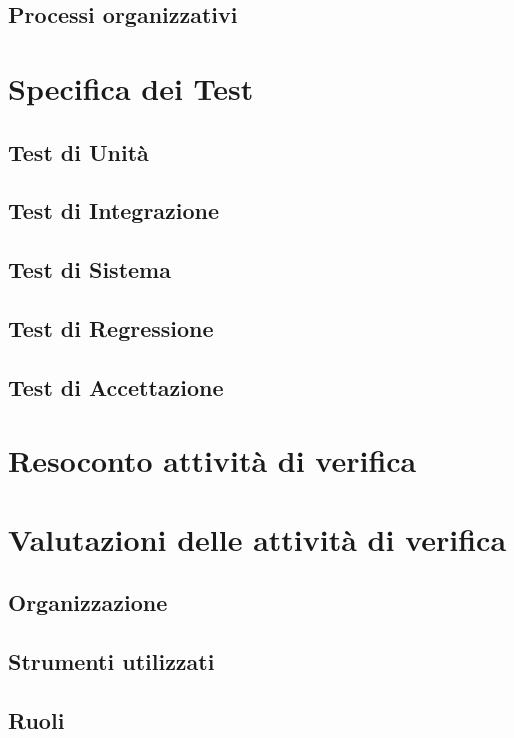 \documentclass[5pt]{article}
\begin{document}
	\subsection{Processi organizzativi}
	
	
	
	\section{Specifica dei Test}
	
	\subsection{Test di Unità}
	
	\subsection{Test di Integrazione}
	
	\subsection{Test di Sistema}
	
	\subsection{Test di Regressione}
	
	\subsection{Test di Accettazione}
	
	
	
	\section{Resoconto attività di verifica}
	
	
	
	\section{Valutazioni delle attività di verifica}
		
	\subsection{Organizzazione}
	
	\subsection{Strumenti utilizzati}
	
	\subsection{Ruoli}
	
	
\end{document}
